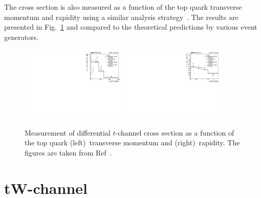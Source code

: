\documentclass[12pt]{article}
\begin{document}
The cross section is also measured as a function of the top quark transverse momentum and rapidity using a similar analysis strategy~\cite{tchannel-diff}. The results are presented in Fig.~\ref{fig:tchan-diff} and compared to the theoretical predictions by various event generators. 



\begin{figure}[!htb]
\begin{center}
\includegraphics[width=0.45\textwidth]{unfolded_top_pt.pdf}\hspace{0.02\textwidth}
\includegraphics[width=0.45\textwidth]{unfolded_top_y.pdf}
\caption{\label{fig:tchan-diff}Measurement of differential $t$-channel cross section as a function of the top quark (left)~transverse momentum and (right)~rapidity. The figures are taken from Ref~\cite{tchannel-diff}.}
\end{center}
\end{figure}

\section{tW-channel}
\end{document}
